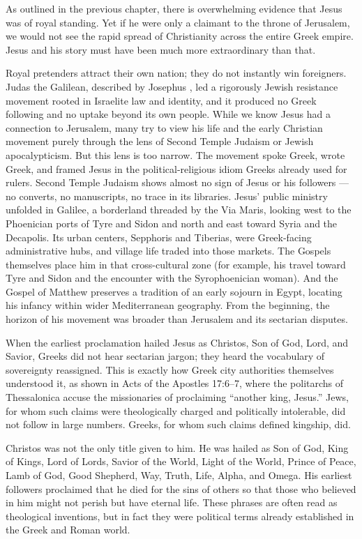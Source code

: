 As outlined in the previous chapter, there is overwhelming evidence that Jesus was of royal standing.
Yet if he were only a claimant to the throne of Jerusalem, we would not see the rapid spread of Christianity across the entire Greek empire.
Jesus and his story must have been much more extraordinary than that.

Royal pretenders attract their own nation; they do not instantly win foreigners.
Judas the Galilean, described by Josephus \cite[18.1--10]{josephus:ant} \cite[2.117--118]{josephus:war}, led a rigorously Jewish resistance movement rooted in Israelite law and identity, and it produced no Greek following and no uptake beyond its own people.
While we know Jesus had a connection to Jerusalem, many try to view his life and the early Christian movement purely through the lens of Second Temple Judaism or Jewish apocalypticism.
But this lens is too narrow.
The movement spoke Greek, wrote Greek, and framed Jesus in the political-religious idiom Greeks already used for rulers.
Second Temple Judaism shows almost no sign of Jesus or his followers --- no converts, no manuscripts, no trace in its libraries.
Jesus’ public ministry unfolded in Galilee, a borderland threaded by the Via Maris, looking west to the Phoenician ports of Tyre and Sidon and north and east toward Syria and the Decapolis.
Its urban centers, Sepphoris and Tiberias, were Greek-facing administrative hubs, and village life traded into those markets.
The Gospels themselves place him in that cross-cultural zone (for example, his travel toward Tyre and Sidon and the encounter with the Syrophoenician woman).
And the Gospel of Matthew preserves a tradition of an early sojourn in Egypt, locating his infancy within wider Mediterranean geography.
From the beginning, the horizon of his movement was broader than Jerusalem and its sectarian disputes.

When the earliest proclamation hailed Jesus as Christos, Son of God, Lord, and Savior, Greeks did not hear sectarian jargon; they heard the vocabulary of sovereignty reassigned.
This is exactly how Greek city authorities themselves understood it, as shown in Acts of the Apostles 17:6–7, where the politarchs of Thessalonica accuse the missionaries of proclaiming ``another king, Jesus.''
Jews, for whom such claims were theologically charged and politically intolerable, did not follow in large numbers.
Greeks, for whom such claims defined kingship, did.

Christos was not the only title given to him.
He was hailed as Son of God, King of Kings, Lord of Lords, Savior of the World, Light of the World, Prince of Peace, Lamb of God, Good Shepherd, Way, Truth, Life, Alpha, and Omega.
His earliest followers proclaimed that he died for the sins of others so that those who believed in him might not perish but have eternal life.
These phrases are often read as theological inventions, but in fact they were political terms already established in the Greek and Roman world.

